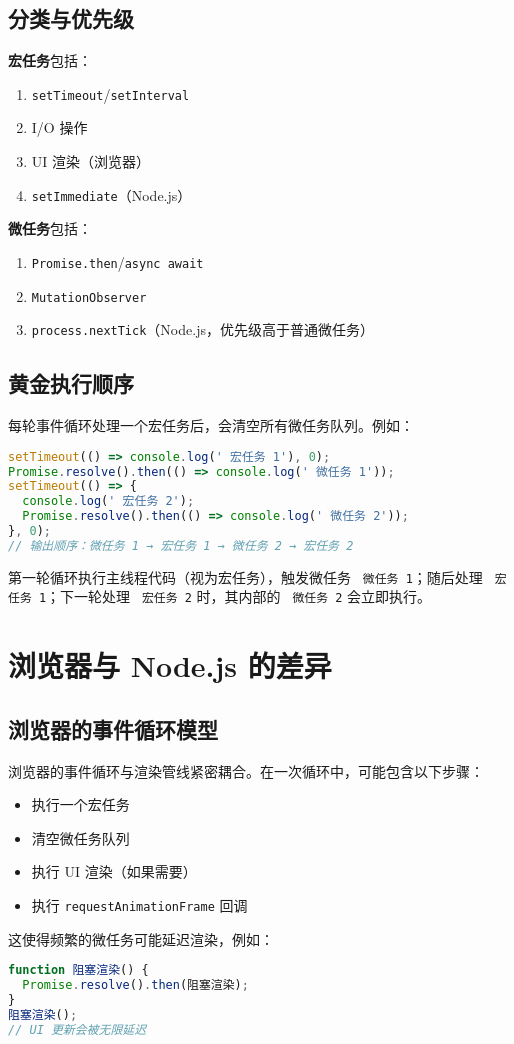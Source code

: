 \section{分类与优先级}
\textbf{宏任务}包括：\par
\begin{enumerate}
\item \verb!setTimeout!/\verb!setInterval!
\item I/O 操作
\item UI 渲染（浏览器）
\item \verb!setImmediate!（Node.js）
\end{enumerate}
\textbf{微任务}包括：\par
\begin{enumerate}
\item \verb!Promise.then!/\verb!async await!
\item \verb!MutationObserver!
\item \verb!process.nextTick!（Node.js，优先级高于普通微任务）
\end{enumerate}
\section{黄金执行顺序}
每轮事件循环处理一个宏任务后，会清空所有微任务队列。例如：\par
\begin{lstlisting}[language=javascript]
setTimeout(() => console.log(' 宏任务 1'), 0);
Promise.resolve().then(() => console.log(' 微任务 1'));
setTimeout(() => {
  console.log(' 宏任务 2');
  Promise.resolve().then(() => console.log(' 微任务 2'));
}, 0);
// 输出顺序：微任务 1 → 宏任务 1 → 微任务 2 → 宏任务 2
\end{lstlisting}
第一轮循环执行主线程代码（视为宏任务），触发微任务 \verb! 微任务 1!；随后处理 \verb! 宏任务 1!；下一轮处理 \verb! 宏任务 2! 时，其内部的 \verb! 微任务 2! 会立即执行。\par
\chapter{浏览器与 Node.js 的差异}
\section{浏览器的事件循环模型}
浏览器的事件循环与渲染管线紧密耦合。在一次循环中，可能包含以下步骤：\par
\begin{itemize}
\item 执行一个宏任务
\item 清空微任务队列
\item 执行 UI 渲染（如果需要）
\item 执行 \verb!requestAnimationFrame! 回调
\end{itemize}
这使得频繁的微任务可能延迟渲染，例如：\par
\begin{lstlisting}[language=javascript]
function 阻塞渲染() {
  Promise.resolve().then(阻塞渲染);
}
阻塞渲染();
// UI 更新会被无限延迟
\end{lstlisting}
